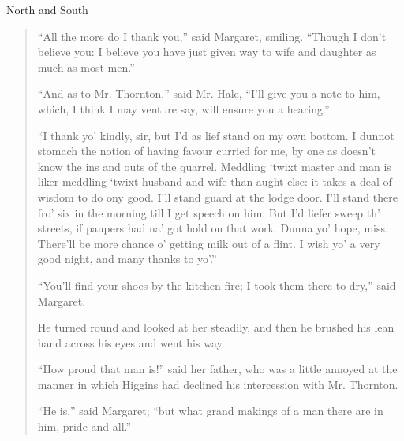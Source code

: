 \begin{texts}{North and South}
\begin{quote}
    ``All the more do I thank you,'' said Margaret, smiling. ``Though I don't believe you: I believe you have just given way to wife and daughter as much as most men.''
    
    ``And as to Mr. Thornton,'' said Mr. Hale, ``I'll give you a note to him, which, I think I may venture say, will ensure you a hearing.''
    
    ``I thank yo' kindly, sir, but I'd as lief stand on my own bottom. I dunnot stomach the notion of having favour curried for me, by one as doesn't know the ins and outs of the quarrel. Meddling `twixt master and man is liker meddling `twixt husband and wife than aught else: it takes a deal of wisdom to do ony good. I'll stand guard at the lodge door. I'll stand there fro' six in the morning till I get speech on him. But I'd liefer sweep th' streets, if paupers had na' got hold on that work. Dunna yo' hope, miss. There'll be more chance o' getting milk out of a flint. I wish yo' a very good night, and many thanks to yo'.''
    
    ``You'll find your shoes by the kitchen fire; I took them there to dry,'' said Margaret.
    
    He turned round and looked at her steadily, and then he brushed his lean hand across his eyes and went his way.
    
    ``How proud that man is!'' said her father, who was a little annoyed at the manner in which Higgins had declined his intercession with Mr. Thornton.
    
    ``He is,'' said Margaret; ``but what grand makings of a man there are in him, pride and all.''
\end{quote}


\end{texts}

